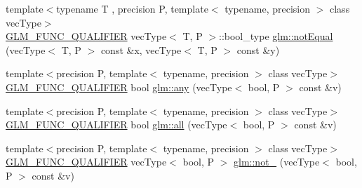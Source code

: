 \begin{DoxyCompactItemize}
\item 
{\footnotesize template$<$typename T , precision P, template$<$ typename, precision $>$ class vec\+Type$>$ }\\\hyperlink{setup_8hpp_a33fdea6f91c5f834105f7415e2a64407}{G\+L\+M\+\_\+\+F\+U\+N\+C\+\_\+\+Q\+U\+A\+L\+I\+F\+I\+ER} vec\+Type$<$ T, P $>$\+::bool\+\_\+type \hyperlink{group__core__func__vector__relational_ga85d7bc5613c4dcc2d5873ec9d6ed4c19}{glm\+::not\+Equal} (vec\+Type$<$ T, P $>$ const \&x, vec\+Type$<$ T, P $>$ const \&y)
\item 
{\footnotesize template$<$precision P, template$<$ typename, precision $>$ class vec\+Type$>$ }\\\hyperlink{setup_8hpp_a33fdea6f91c5f834105f7415e2a64407}{G\+L\+M\+\_\+\+F\+U\+N\+C\+\_\+\+Q\+U\+A\+L\+I\+F\+I\+ER} bool \hyperlink{group__core__func__vector__relational_ga632a2644532d9332011c8860400d30b2}{glm\+::any} (vec\+Type$<$ bool, P $>$ const \&v)
\item 
{\footnotesize template$<$precision P, template$<$ typename, precision $>$ class vec\+Type$>$ }\\\hyperlink{setup_8hpp_a33fdea6f91c5f834105f7415e2a64407}{G\+L\+M\+\_\+\+F\+U\+N\+C\+\_\+\+Q\+U\+A\+L\+I\+F\+I\+ER} bool \hyperlink{group__core__func__vector__relational_ga14bbc94f2ae2774a1d64d91f8767773e}{glm\+::all} (vec\+Type$<$ bool, P $>$ const \&v)
\item 
{\footnotesize template$<$precision P, template$<$ typename, precision $>$ class vec\+Type$>$ }\\\hyperlink{setup_8hpp_a33fdea6f91c5f834105f7415e2a64407}{G\+L\+M\+\_\+\+F\+U\+N\+C\+\_\+\+Q\+U\+A\+L\+I\+F\+I\+ER} vec\+Type$<$ bool, P $>$ \hyperlink{group__core__func__vector__relational_ga4329ecbc2ef012c9ec704bd09da1f177}{glm\+::not\+\_\+} (vec\+Type$<$ bool, P $>$ const \&v)
\end{DoxyCompactItemize}
